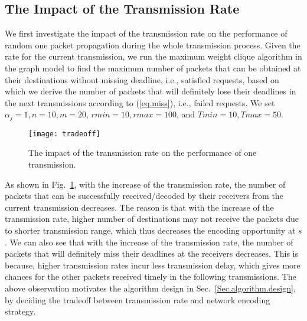 \documentclass[journal]{IEEEtran}
\begin{document}
\vspace{-0.1in}
\subsection{The Impact of the Transmission Rate}\vspace{-0.02in}
We first investigate the impact of the transmission rate on the performance of random one packet propagation during the whole transmission process. Given the rate for the current transmission, we run the maximum weight clique algorithm in the graph model to find the maximum number of packets that can be obtained at their destinations without missing deadline, i.e., satisfied requests, based on which we derive the number of packets that will definitely lose their deadlines in the next transmissions according to (\ref{eq.miss}), i.e., failed requests. We set $\alpha_j=1,n=10,m=20$, $rmin=10,rmax=100$, and $Tmin=10,Tmax=50$.
\begin{figure}[h]
\begin{center}\vspace{-0.1in}
\texttt{[image: tradeoff]}\vspace{-0.1in}
\caption{The impact of the transmission rate on the performance of one transmission.}\vspace{-0.15in} \label{sim.tradeoff}
\end{center}\vspace{-0.1in}
\end{figure}

As shown in Fig.~\ref{sim.tradeoff}, with the increase of the transmission rate, the number of packets that can be successfully received/decoded by their receivers from the current transmission decreases. The reason is that with the increase of the transmission rate, higher number of destinations may not receive the packets due to shorter transmission range, which thus decreases the encoding opportunity at $s$. We can also see that with the increase of the transmission rate, the number of packets that will definitely miss their deadlines at the receivers decreases. This is because, higher transmission rates incur less transmission delay, which gives more chances for the other packets received timely in the following transmissions. The above observation motivates the algorithm design in Sec.~\ref{Sec.algorithm.design}, by deciding the tradeoff between transmission rate and network encoding strategy.
\end{document}
